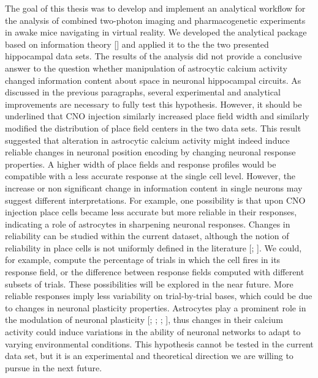 The goal of this thesis was to develop and implement an analytical workflow for the analysis of combined two-photon imaging and pharmacogenetic experiments in awake mice navigating in virtual reality. 
We developed the analytical package based on information theory [\cite{shannon1948}] and applied it to the the two presented hippocampal data sets. 
The results of the analysis did not provide a conclusive answer to the question whether manipulation of astrocytic calcium activity changed information content about space in neuronal hippocampal circuits. 
As discussed in the previous paragraphs, several experimental and analytical improvements are necessary to fully test this hypothesis.
However, it should be underlined that CNO injection similarly increased place field width and similarly modified the distribution of place field centers in the two data sets. 
This result suggested that alteration in astrocytic calcium activity might indeed induce reliable changes in neuronal position encoding by changing neuronal response properties. 
A higher width of place fields and response profiles would be compatible with a less accurate response at the single cell level. 
However, the increase or non significant change in information content in single neurons may suggest different interpretations. 
For example, one possibility is that upon CNO injection place cells became less accurate but more reliable in their responses, indicating a role of astrocytes in sharpening neuronal responses.
Changes in reliability can be studied within the current dataset, although the notion of reliability in place cells is not uniformly defined in the literature [\cite{markus1994spatial}; \cite{trimper2017methodological}].
We could, for example, compute the percentage of trials in which the cell fires in its response field, or the difference between response fields computed with different subsets of trials.
These possibilities will be explored in the near future.
More reliable responses imply less variability on trial-by-trial bases, which could be due to changes in neuronal plasticity properties. 
Astrocytes play a prominent role in the modulation of neuronal plasticity [\cite{pascual2005}; \cite{serrano2006gabaergic}; \cite{henneberger2010}; \cite{min2012astrocyte}], thus changes in their calcium activity could induce variations in the ability of neuronal networks to adapt to varying environmental conditions. 
This hypothesis cannot be tested in the current data set, but it is an experimental and theoretical direction we are willing to pursue in the next future. 

